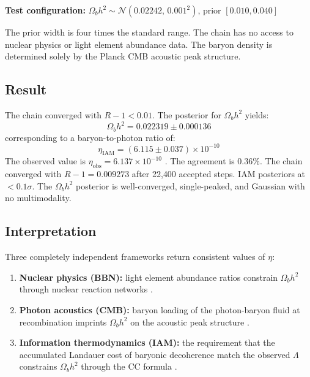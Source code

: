 \documentclass[12pt,a4paper]{article}
\begin{document}
\textbf{Test configuration:}
$\Omega_b h^2 \sim \mathcal{N}(0.02242,\, 0.001^2)$, prior $[0.010, 0.040]$

The prior width is four times the standard range. The chain has no
access to nuclear physics or light element abundance data. The baryon
density is determined solely by the Planck CMB acoustic peak structure.

\subsection{Result}

The chain converged with $R - 1 < 0.01$. The posterior for
$\Omega_b h^2$ yields:
\begin{equation}
\Omega_b h^2 = 0.022319 \pm 0.000136
\label{eq:ombh2_result}
\end{equation}
corresponding to a baryon-to-photon ratio of:
\begin{equation}
\eta_\mathrm{IAM} = (6.115 \pm 0.037) \times 10^{-10}
\label{eq:eta_result}
\end{equation}
The observed value is $\eta_\mathrm{obs} = 6.137 \times 10^{-10}$
\citep{cyburt2016, planck2020}. The agreement is $0.36\%$.
The chain converged with $R - 1 = 0.009273$ after 22{,}400 accepted steps.
IAM posteriors at $< 0.1\sigma$. The $\Omega_b h^2$ posterior is
well-converged, single-peaked, and Gaussian with no multimodality.

\subsection{Interpretation}

Three completely independent frameworks return consistent values of
$\eta$:
\begin{enumerate}
\item \textbf{Nuclear physics (BBN):} light element abundance ratios
constrain $\Omega_b h^2$ through nuclear reaction networks
\citep{cyburt2016}.
\item \textbf{Photon acoustics (CMB):} baryon loading of the
photon-baryon fluid at recombination imprints $\Omega_b h^2$ on
the acoustic peak structure \citep{planck2020}.
\item \textbf{Information thermodynamics (IAM):} the requirement that
the accumulated Landauer cost of baryonic decoherence match the
observed $\Lambda$ constrains $\Omega_b h^2$ through the CC formula
\citep{mahaffey2026_cc}.
\end{enumerate}
\end{document}
